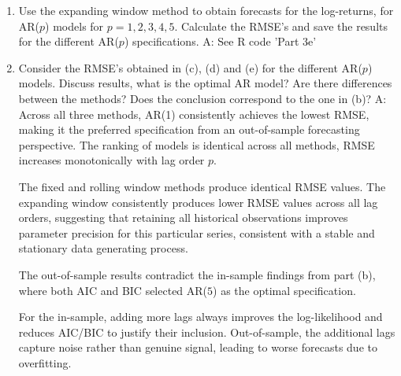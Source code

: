 \documentclass{article}
\begin{document}
\begin{enumerate}
    \item [(e)] Use the expanding window method to obtain forecasts for the log-returns, for AR($p$) models for $p = 1,2,3,4,5$. Calculate the RMSE’s and save the results for the different AR($p$) specifications. \newline \newline
    A: See R code 'Part 3e'
    \newpage
    \item [(f)] Consider the RMSE’s obtained in (c), (d) and (e) for the different AR($p$) models. Discuss results, what is the optimal AR model? Are there differences between the methods? Does the conclusion correspond to the one in (b)? \newline \newline
    A: Across all three methods, AR(1) consistently achieves the lowest RMSE, making it the preferred specification from an out-of-sample forecasting perspective. The ranking of models is identical across all methods, RMSE increases monotonically with lag order $p$.
    
    The fixed and rolling window methods produce identical RMSE values. The expanding window consistently produces lower RMSE values across all lag orders, suggesting that retaining all historical observations improves parameter precision for this particular series, consistent with a stable and stationary data generating process.
    
    The out-of-sample results contradict the in-sample findings from part (b), where both AIC and BIC selected AR($5$) as the optimal specification.
    
    For the in-sample, adding more lags always improves the log-likelihood and reduces AIC/BIC to justify their inclusion. Out-of-sample, the additional lags capture noise rather than genuine signal, leading to worse forecasts due to overfitting.
\end{enumerate}
\end{document}
